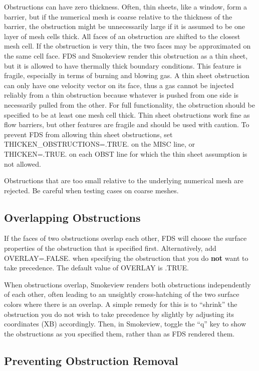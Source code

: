 \documentclass[11pt]{book}
\begin{document}
Obstructions can have zero thickness. Often, thin sheets, like a window, form a barrier,
but if the numerical mesh is coarse relative to the thickness of the barrier, the obstruction
might be unnecessarily large if it is assumed to be one layer of mesh cells thick. All faces
of an obstruction are shifted to the closest mesh cell. If the obstruction is very thin, the two
faces may be approximated on the same cell face. FDS and Smokeview render
this obstruction as a thin sheet, but it is allowed to have thermally
thick boundary conditions. This feature is fragile, especially in terms
of burning and blowing gas. A thin sheet obstruction can only have one velocity
vector on its face, thus a gas cannot be injected reliably from a
thin obstruction because whatever is pushed from one side is necessarily pulled from the other.
For full functionality, the obstruction should be specified to
be at least one mesh cell thick. Thin sheet obstructions
work fine as flow barriers, but other features are fragile and should be used with
caution. To prevent FDS from allowing thin sheet obstructions, set {\ct THICKEN\_OBSTRUCTIONS=.TRUE.} on the
{\ct MISC} line, or {\ct THICKEN=.TRUE.} on each {\ct OBST} line for which the thin sheet assumption is not allowed.

Obstructions that are too small relative to the underlying numerical mesh are rejected. Be careful when testing cases on coarse meshes.

\subsection{Overlapping Obstructions}

If the faces of two obstructions overlap each other, FDS will choose the surface properties of the obstruction that is specified first. Alternatively, add {\ct OVERLAY=.FALSE.} when specifying the obstruction that you do {\bf not} want to take precedence. The default value of {\ct OVERLAY} is {\ct .TRUE.}

When obstructions overlap, Smokeview renders both obstructions independently of each other, often leading to an unsightly cross-hatching of the two surface colors where there is an overlap. A simple remedy for this is to ``shrink'' the obstruction you do not wish to take precedence by slightly by adjusting its coordinates ({\ct XB}) accordingly. Then, in Smokeview, toggle the ``q'' key to show the obstructions as you specified them, rather than as FDS rendered them.

\subsection{Preventing Obstruction Removal}
\end{document}
